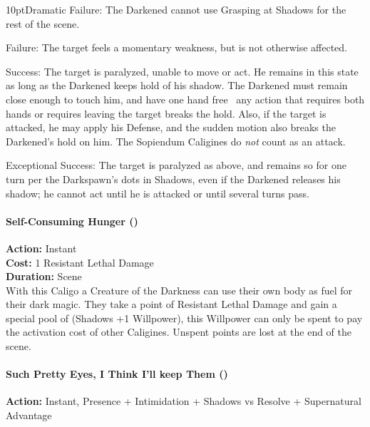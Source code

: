     \begin{myindentpar}{10pt}Dramatic Failure: The Darkened cannot use Grasping at Shadows for the rest of the scene.
    
    Failure: The target feels a momentary weakness, but is not otherwise affected.
    
    Success: The target is paralyzed, unable to move or act. He remains in this state as long as the Darkened keeps hold of his shadow. The Darkened must remain close enough to touch him, and have one hand free \textendash\, any action that requires both hands or requires leaving the target breaks the hold. Also, if the target is attacked, he may apply his Defense, and the sudden motion also breaks the Darkened's hold on him. The Sopiendum Caligines do \textit{not} count as an attack.
    
    Exceptional Success: The target is paralyzed as above, and remains so for one turn per the Darkspawn's dots in Shadows, even if the Darkened releases his shadow; he cannot act until he is attacked or until several turns pass.\end{myindentpar}
   
\paragraph*{Self-Consuming Hunger (\textbullet\textbullet\textbullet)}

\noindent \textbf{Action:} Instant\\

\noindent \textbf{Cost:} 1 Resistant Lethal Damage\\

\noindent \textbf{Duration:} Scene\\

\noindent With this Caligo a Creature of the Darkness can use their own body as fuel for their dark magic. They take a point of Resistant Lethal Damage and gain a special pool of (Shadows +1 Willpower), this Willpower can only be spent to pay the activation cost of other Caligines. Unspent points are lost at the end of the scene. 

\paragraph*{Such Pretty Eyes, I Think I'll keep Them (\textbullet\textbullet\textbullet)}

\noindent \textbf{Action:} Instant, Presence + Intimidation + Shadows vs Resolve + Supernatural Advantage\\

